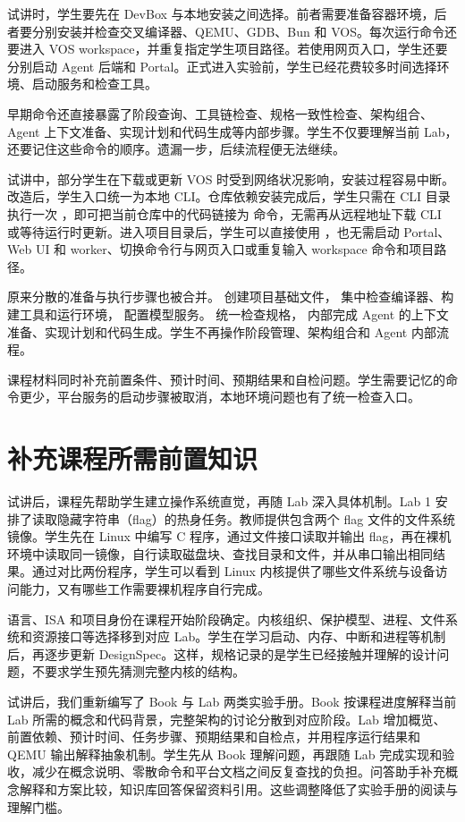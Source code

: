 试讲时，学生要先在 DevBox 与本地安装之间选择。前者需要准备容器环境，后者要分别安装并检查交叉编译器、QEMU、GDB、Bun 和 VOS。每次运行命令还要进入 VOS workspace，并重复指定学生项目路径。若使用网页入口，学生还要分别启动 Agent 后端和 Portal。正式进入实验前，学生已经花费较多时间选择环境、启动服务和检查工具。

早期命令还直接暴露了阶段查询、工具链检查、规格一致性检查、架构组合、Agent 上下文准备、实现计划和代码生成等内部步骤。学生不仅要理解当前 Lab，还要记住这些命令的顺序。遗漏一步，后续流程便无法继续。

试讲中，部分学生在下载或更新 VOS 时受到网络状况影响，安装过程容易中断。改造后，学生入口统一为本地 CLI。仓库依赖安装完成后，学生只需在 CLI 目录执行一次 ，即可把当前仓库中的代码链接为  命令，无需再从远程地址下载 CLI 或等待运行时更新。进入项目目录后，学生可以直接使用 ，也无需启动 Portal、Web UI 和 worker、切换命令行与网页入口或重复输入 workspace 命令和项目路径。

原来分散的准备与执行步骤也被合并。 创建项目基础文件， 集中检查编译器、构建工具和运行环境， 配置模型服务。 统一检查规格， 内部完成 Agent 的上下文准备、实现计划和代码生成。学生不再操作阶段管理、架构组合和 Agent 内部流程。

课程材料同时补充前置条件、预计时间、预期结果和自检问题。学生需要记忆的命令更少，平台服务的启动步骤被取消，本地环境问题也有了统一检查入口。

\section{补充课程所需前置知识}

试讲后，课程先帮助学生建立操作系统直觉，再随 Lab 深入具体机制。Lab 1 安排了读取隐藏字符串（flag）的热身任务。教师提供包含两个 flag 文件的文件系统镜像。学生先在 Linux 中编写 C 程序，通过文件接口读取并输出 flag，再在裸机环境中读取同一镜像，自行读取磁盘块、查找目录和文件，并从串口输出相同结果。通过对比两份程序，学生可以看到 Linux 内核提供了哪些文件系统与设备访问能力，又有哪些工作需要裸机程序自行完成。

语言、ISA 和项目身份在课程开始阶段确定。内核组织、保护模型、进程、文件系统和资源接口等选择移到对应 Lab。学生在学习启动、内存、中断和进程等机制后，再逐步更新 DesignSpec。这样，规格记录的是学生已经接触并理解的设计问题，不要求学生预先猜测完整内核的结构。

试讲后，我们重新编写了 Book 与 Lab 两类实验手册。Book 按课程进度解释当前 Lab 所需的概念和代码背景，完整架构的讨论分散到对应阶段。Lab 增加概览、前置依赖、预计时间、任务步骤、预期结果和自检点，并用程序运行结果和 QEMU 输出解释抽象机制。学生先从 Book 理解问题，再跟随 Lab 完成实现和验收，减少在概念说明、零散命令和平台文档之间反复查找的负担。问答助手补充概念解释和方案比较，知识库回答保留资料引用。这些调整降低了实验手册的阅读与理解门槛。

